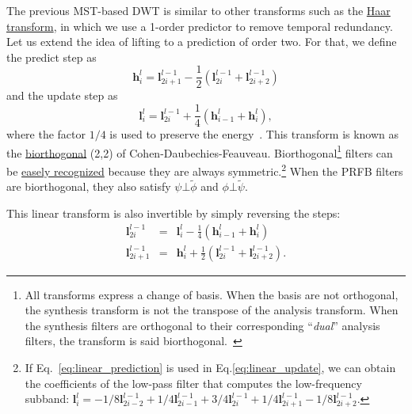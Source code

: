 The previous MST-based DWT is similar to other transforms such as the
\href{https://en.wikipedia.org/wiki/Haar_wavelet}{Haar transform}, in
which we use a 1-order predictor to remove temporal
redundancy. Let us extend the idea of lifting to a prediction of order
two. For that, we define the predict step as
\begin{equation}
  {\mathbf h}^l_i = {\mathbf l}^{l-1}_{2i+1} - \frac{1}{2}({\mathbf l}^{l-1}_{2i} + {\mathbf l}^{l-1}_{2i+2})
  \label{eq:linear_prediction}
\end{equation}
and the update step as
\begin{equation}
  {\mathbf l}^l_i = {\mathbf l}^{l-1}_{2i} + \frac{1}{4}({\mathbf h}^l_{i-1} + {\mathbf h}^l_i),
  \label{eq:linear_update}
\end{equation}
where the factor $1/4$ is used to preserve the
energy~\cite{sweldens1997building}. This transform is known as the
\href{https://en.wikipedia.org/wiki/Biorthogonal_wavelet}{biorthogonal}
(2,2) of Cohen-Daubechies-Feauveau.  Biorthogonal\footnote{All
  transforms express a change of basis. When the basis are not
  orthogonal, the synthesis transform is not the transpose of the
  analysis transform. When the synthesis filters are orthogonal to
  their corresponding ``\emph{dual}'' analysis filters, the transform is
  said biorthogonal.~\cite{vetterli2014foundations}} filters can be
\href{http://wavelets.pybytes.com/}{easely recognized} because they
are always symmetric.\footnote{If Eq.~\eqref{eq:linear_prediction} is used in Eq.\eqref{eq:linear_update}, we can obtain the coefficients of the low-pass filter that computes the low-frequency subband: ${\mathbf l}^l_i=-1/8{\mathbf l}^{l-1}_{2i-2}+1/4{\mathbf l}^{l-1}_{2i-1}+3/4{\mathbf l}^{l-1}_{2i}+1/4{\mathbf l}^{l-1}_{2i+1}-1/8{\mathbf l}^{l-1}_{2i+2}$.} When the PRFB filters are biorthogonal,
they also satisfy $\psi\bot\tilde\phi$ and
$\phi\bot\tilde\psi$.

This linear transform is also invertible by simply reversing the steps:
\begin{equation}
  \begin{array}{rcl}
    {\mathbf l}^{l-1}_{2i} & = & {\mathbf l}^l_i - \frac{1}{4}({\mathbf h}^l_{i-1} + {\mathbf h}^l_i)\\
    {\mathbf l}^{l-1}_{2i+1} & = & {\mathbf h}^l_i + \frac{1}{2}({\mathbf l}^{l-1}_{2i} + {\mathbf l}^{l-1}_{2i+2}).
  \end{array}
\end{equation}



